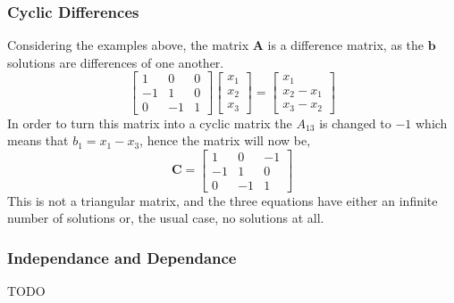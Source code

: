         \subsubsection{Cyclic Differences}
            Considering the examples above, the matrix \(\boldsymbol{A}\) is a difference matrix, as the \(\boldsymbol{b}\) solutions are differences of one another.
            \begin{equation}
                \begin{bmatrix}
                    1  & 0  & 0 \\
                    -1 & 1  & 0 \\
                    0  & -1 & 1
                \end{bmatrix}
                \begin{bmatrix}
                    x_1 \\
                    x_2 \\
                    x_3
                \end{bmatrix}
                =
                \begin{bmatrix}
                    x_1 \\
                    x_2 - x_1\\
                    x_3 - x_2
                \end{bmatrix}
            \end{equation}
            In order to turn this matrix into a cyclic matrix the \(A_{13}\) is changed to \(-1\) which means that \(b_1 = x_1-x_3\), hence the matrix will now be,
            \begin{equation}
                \boldsymbol{C} =
                \begin{bmatrix}
                    1  & 0  & -1 \\
                    -1 & 1  & 0 \\
                    0  & -1 & 1
                \end{bmatrix}
            \end{equation}
            This is not a triangular matrix, and the three equations have either an infinite number of solutions or, the usual case, no solutions at all.
        
        \subsubsection{Independance and Dependance}
        TODO